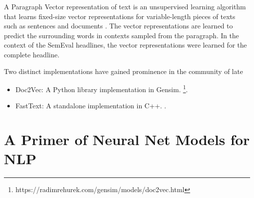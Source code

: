 \documentclass[11pt,a4paper]{article}
\begin{document}
    A Paragraph Vector representation of text is an unsupervised learning algorithm that learns fixed-size vector representations for variable-length pieces of texts such as sentences and documents \cite{le2014distributed}. The vector representations are learned to predict the surrounding words in contexts sampled from the paragraph. In the context of the SemEval headlines, the vector representations were learned for the complete headline.

    Two distinct implementations have gained prominence in the community of late
    \begin{itemize}
      \item 
        Doc2Vec: A Python library implementation in Gensim. \footnote{https://radimrehurek.com/gensim/models/doc2vec.html}.
      \item 
        FastText: A standalone implementation in C++. \cite{bojanowski2016enriching} \cite{joulin2016bag}.
    \end{itemize}
  



\section{A Primer of Neural Net Models for NLP} %
\label{sec:a_primer_of_neural_net_models_for_nlp}
\end{document}

